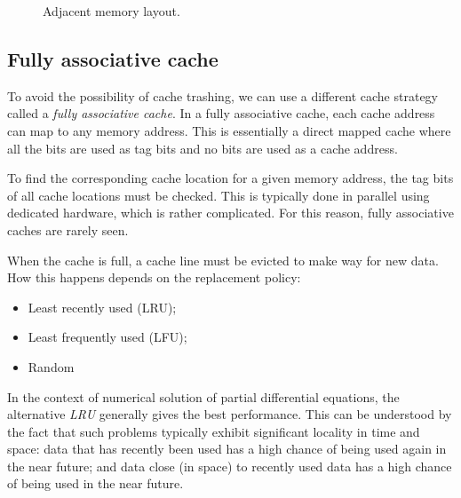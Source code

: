 \begin{figure}
  \centering
  \caption{Adjacent memory layout.}
  \label{fig:AdjacentMemory}
\end{figure}

\subsection{Fully associative cache}

To avoid the possibility of cache trashing, we can use a different cache
strategy called a \emph{fully associative cache}. In a fully associative cache,
each cache address can map to any memory address. This is essentially a direct
mapped cache where all the bits are used as tag bits and no bits are used as a
cache address.

To find the corresponding cache location for a given memory address, the tag
bits of all cache locations must be checked. This is typically done in parallel
using dedicated hardware, which is rather complicated. For this reason, fully
associative caches are rarely seen.

When the cache is full, a cache line must be evicted to make way for new data.
How this happens depends on the replacement policy:
\begin{itemize}
\item Least recently used (LRU);
\item Least frequently used (LFU);
\item Random
\end{itemize}
In the context of numerical solution of partial differential equations, the
alternative \emph{LRU} generally gives the best performance. This can be
understood by the fact that such problems typically exhibit significant locality
in time and space: data that has recently been used has a high chance of being
used again in the near future; and data close (in space) to recently used data
has a high chance of being used in the near future.

